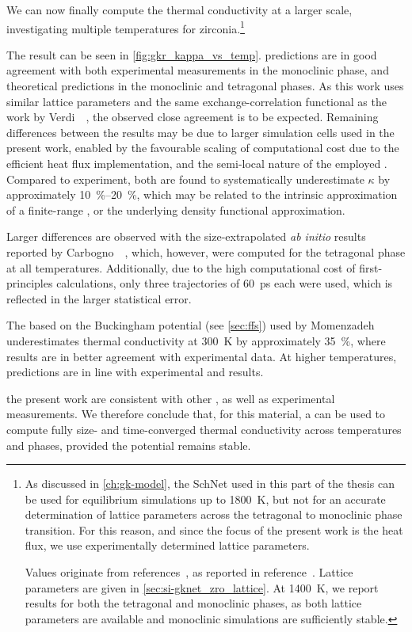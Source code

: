 \noindent
We can now finally compute the thermal conductivity at a larger scale, investigating multiple temperatures for zirconia.\footnote[][-9\baselineskip]{As discussed in \cref{ch:gk-model}, the SchNet \glp used in this part of the thesis can be used for equilibrium \md simulations up to \qty{1800}{K}, but not for an accurate determination of lattice parameters across the tetragonal to monoclinic phase transition. For this reason, and since the focus of the present work is the heat flux, we use experimentally determined lattice parameters.

Values originate from references~\cite{ps1969t,kh1998t}, as reported in reference~\cite{vkjk2021q}. Lattice parameters are given in \cref{sec:si-gknet_zro_lattice}. At \qty{1400}{K}, we report results for both the tetragonal and monoclinic phases, as both lattice parameters are available and monoclinic simulations are sufficiently stable.}

The result can be seen in \cref{fig:gkr_kappa_vs_temp}.
\glp predictions are in good agreement with both experimental measurements in the monoclinic phase, and theoretical \mlp{} predictions in the monoclinic and tetragonal phases.
As this work uses similar lattice parameters and the same exchange-correlation functional as the work by Verdi~\etal{}~\cite{vkjk2021q}, the observed close agreement is to be expected.
Remaining differences between the \mlp results may be due to larger simulation cells used in the present work, enabled by the favourable scaling of computational cost due to the efficient heat flux implementation, and the semi-local nature of the employed \glp.
Compared to experiment, both \mlps are found to systematically underestimate $\kappa$ by approximately \SIrange{10}{20}{\percent}, which may be related to the intrinsic approximation of a finite-range \mlp{}, or the underlying density functional approximation.

Larger differences are observed with the size-extrapolated \emph{ab initio} \gk results reported by Carbogno~\etal~\cite{crs2017t}, which, however, were computed for the tetragonal phase at all temperatures. Additionally, due to the high computational cost of first-principles calculations, only three trajectories of \qty{60}{ps} each were used, which is reflected in the larger statistical error. 

The \ff based on the Buckingham potential (see \cref{sec:ffs}) used by Momenzadeh~\etal~\cite{mbm2020t} underestimates thermal conductivity at \qty{300}{K} by approximately \qty{35}{\percent}, where \mlp results are in better agreement with experimental data. At higher temperatures, \ff predictions are in line with experimental and \mlp results.

{} the present work are consistent with other \mlps, as well as experimental measurements. We therefore conclude that, for this material, a \glp can be used to compute fully size- and time-converged thermal conductivity across temperatures and phases, provided the potential remains stable.
